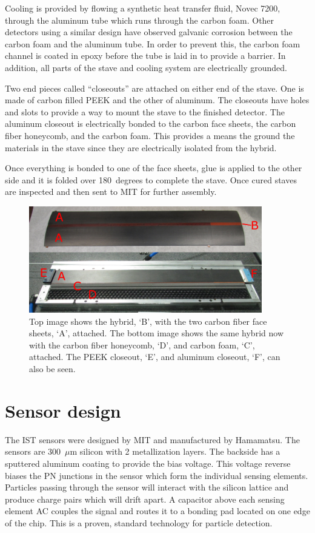 \documentclass[preprint,12pt]{elsarticle}
\begin{document}
Cooling is provided by flowing a synthetic heat transfer fluid, Novec 7200,
through the aluminum tube which runs through the carbon
foam. Other detectors using a similar design have observed galvanic corrosion
between the carbon foam and the aluminum tube. In order to prevent this, the
carbon foam channel is coated in epoxy before the tube is laid in to provide a
barrier. In addition, all parts of the stave and cooling system are
electrically grounded.

Two end pieces called ``closeouts'' are attached on either end of the stave. One
is made of carbon filled PEEK and the other of aluminum. The closeouts have
holes and slots to provide a way to mount the stave to the finished detector. The
aluminum closeout is electrically bonded to the carbon face sheets, the carbon
fiber honeycomb, and the carbon foam. This provides a means the ground the
materials in the stave since they are electrically isolated from the hybrid.

Once everything is bonded to one of the face sheets, glue is applied to
the other side and it is folded over 180~degrees to complete the stave. Once
cured staves are inspected and then sent to MIT for further assembly.

\begin{figure}[h]
\begin{center}
\includegraphics[width=4in, keepaspectratio=true, angle=0]{graphics/stave_assmb.png}
\caption{Top image shows the hybrid, `B', with the two carbon fiber face sheets, `A', attached.
The bottom image shows the same hybrid now with the carbon fiber honeycomb, `D', and 
carbon foam, `C', attached. The PEEK closeout, `E', and aluminum closeout, `F', can also be seen.
\label{fig:stave_assmb}}
\end{center}
\end{figure}

\section{Sensor design}
The IST sensors were designed by MIT and
manufactured by Hamamatsu. The sensors are 300~$\mu$m silicon with 2 metallization
layers. The backside has a sputtered aluminum coating to provide the bias voltage.
This voltage reverse biases the PN junctions in the sensor which form the individual
sensing elements. Particles passing through the sensor will interact
with the silicon lattice and produce charge pairs which will drift apart. A capacitor
above each sensing element AC couples the signal and routes it to a bonding pad
located on one edge of the chip. This is a proven, standard technology for
particle detection.
\end{document}
